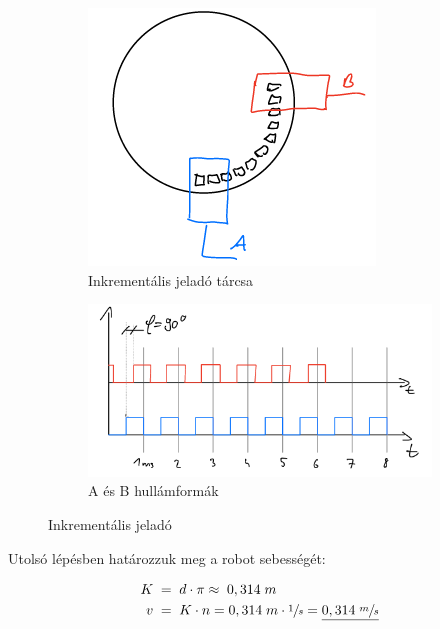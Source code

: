 \begin{figure}[h!]
    \centering
         \begin{subfigure}[b]{0.24\textwidth}
         \centering
         \includegraphics[width=\textwidth]{Figures//tmp/43_tarcsa.png}
         \caption{Inkrementális jeladó tárcsa}
         \label{fig:y equals x}
     \end{subfigure}
     \hfill
     \begin{subfigure}[b]{0.6\textwidth}
         \centering
         \includegraphics[width=\textwidth]{Figures//tmp/43_jelalak.png}
         \caption{A és B hullámformák}
         \label{fig:three sin x}
     \end{subfigure}
    \caption{Inkrementális jeladó}
    \label{fig:enter-label}
\end{figure}

Utolsó lépésben határozzuk meg a robot sebességét:

\begin{equation}
\begin{aligned}{}
    K\;&=\; d \cdot \pi \approx \; 0,314\;m \\
    v\; &= \; K \cdot n = 0,314\;m \cdot \sfrac{1}{s} = \underline{0,314 \; \sfrac{m}{s}}\\
\end{aligned}
\end{equation}



